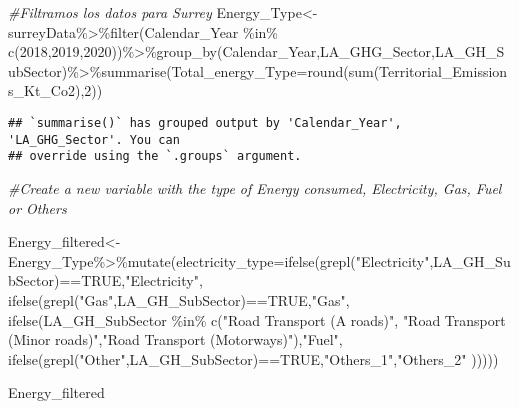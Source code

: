 \documentclass[
]{article}
\newenvironment{Shaded}{\begin{snugshade}}{\end{snugshade}}
\newcommand{\AttributeTok}[1]{\textcolor[rgb]{0.77,0.63,0.00}{#1}}
\newcommand{\CommentTok}[1]{\textcolor[rgb]{0.56,0.35,0.01}{\textit{#1}}}
\newcommand{\ConstantTok}[1]{\textcolor[rgb]{0.00,0.00,0.00}{#1}}
\newcommand{\DecValTok}[1]{\textcolor[rgb]{0.00,0.00,0.81}{#1}}
\newcommand{\FunctionTok}[1]{\textcolor[rgb]{0.00,0.00,0.00}{#1}}
\newcommand{\NormalTok}[1]{#1}
\newcommand{\OtherTok}[1]{\textcolor[rgb]{0.56,0.35,0.01}{#1}}
\newcommand{\SpecialCharTok}[1]{\textcolor[rgb]{0.00,0.00,0.00}{#1}}
\newcommand{\StringTok}[1]{\textcolor[rgb]{0.31,0.60,0.02}{#1}}
\begin{document}
\begin{Shaded}
\begin{Highlighting}[]
\CommentTok{\#Filtramos los datos para Surrey}
\NormalTok{Energy\_Type}\OtherTok{\textless{}{-}}\NormalTok{surreyData}\SpecialCharTok{\%\textgreater{}\%}\FunctionTok{filter}\NormalTok{(Calendar\_Year }\SpecialCharTok{\%in\%} \FunctionTok{c}\NormalTok{(}\DecValTok{2018}\NormalTok{,}\DecValTok{2019}\NormalTok{,}\DecValTok{2020}\NormalTok{))}\SpecialCharTok{\%\textgreater{}\%}\FunctionTok{group\_by}\NormalTok{(Calendar\_Year,LA\_GHG\_Sector,LA\_GH\_SubSector)}\SpecialCharTok{\%\textgreater{}\%}\FunctionTok{summarise}\NormalTok{(}\AttributeTok{Total\_energy\_Type=}\FunctionTok{round}\NormalTok{(}\FunctionTok{sum}\NormalTok{(Territorial\_Emissions\_Kt\_Co2),}\DecValTok{2}\NormalTok{))}
\end{Highlighting}
\end{Shaded}

\begin{verbatim}
## `summarise()` has grouped output by 'Calendar_Year', 'LA_GHG_Sector'. You can
## override using the `.groups` argument.
\end{verbatim}

\begin{Shaded}
\begin{Highlighting}[]
\CommentTok{\#Create a new variable with the type of Energy consumed, Electricity, Gas, Fuel or Others}

\NormalTok{Energy\_filtered}\OtherTok{\textless{}{-}}\NormalTok{Energy\_Type}\SpecialCharTok{\%\textgreater{}\%}\FunctionTok{mutate}\NormalTok{(}\AttributeTok{electricity\_type=}\FunctionTok{ifelse}\NormalTok{(}\FunctionTok{grepl}\NormalTok{(}\StringTok{"Electricity"}\NormalTok{,LA\_GH\_SubSector)}\SpecialCharTok{==}\ConstantTok{TRUE}\NormalTok{,}\StringTok{"Electricity"}\NormalTok{,}
                                            \FunctionTok{ifelse}\NormalTok{(}\FunctionTok{grepl}\NormalTok{(}\StringTok{"Gas"}\NormalTok{,LA\_GH\_SubSector)}\SpecialCharTok{==}\ConstantTok{TRUE}\NormalTok{,}\StringTok{"Gas"}\NormalTok{, }
                                                   \FunctionTok{ifelse}\NormalTok{(LA\_GH\_SubSector }\SpecialCharTok{\%in\%} \FunctionTok{c}\NormalTok{(}\StringTok{"Road Transport (A roads)"}\NormalTok{,  }\StringTok{"Road Transport (Minor roads)"}\NormalTok{,}\StringTok{"Road Transport (Motorways)"}\NormalTok{),}\StringTok{"Fuel"}\NormalTok{, }\FunctionTok{ifelse}\NormalTok{(}\FunctionTok{grepl}\NormalTok{(}\StringTok{"\textquotesingle{}Other\textquotesingle{}"}\NormalTok{,LA\_GH\_SubSector)}\SpecialCharTok{==}\ConstantTok{TRUE}\NormalTok{,}\StringTok{"Others\_1"}\NormalTok{,}\StringTok{"Others\_2"}\NormalTok{ )))))}

\NormalTok{Energy\_filtered}
\end{Highlighting}
\end{Shaded}
\end{document}
